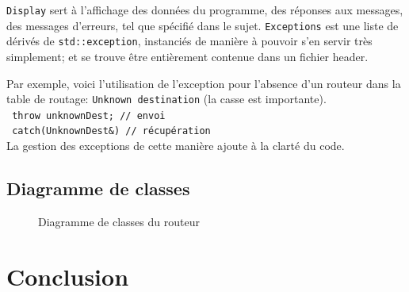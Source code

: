 \documentclass[a4paper,11pt]{article}
\begin{document}
\texttt{Display} sert à l'affichage des données du programme, des réponses aux messages, des messages d'erreurs, tel que spécifié dans le sujet.
\texttt{Exceptions} est une liste de dérivés de \texttt{std::exception}, instanciés de manière à pouvoir s'en servir très simplement; et se trouve être entièrement contenue dans un fichier header.

Par exemple, voici l'utilisation de l'exception pour l'absence d'un routeur dans la table de routage: \texttt{Unknown destination} (la casse est importante).
\\
\verb[ throw unknownDest; // envoi [\\
\verb[ catch(UnknownDest&) // récupération [\\
La gestion des exceptions de cette manière ajoute à la clarté du code.

\subsection{Diagramme de classes} %
\begin{figure}[H]
\begin{center}
\caption{Diagramme de classes du routeur}
\label{diag_api_chords}
\end{center}
\end{figure}
\section*{Conclusion} %

\end{document}
